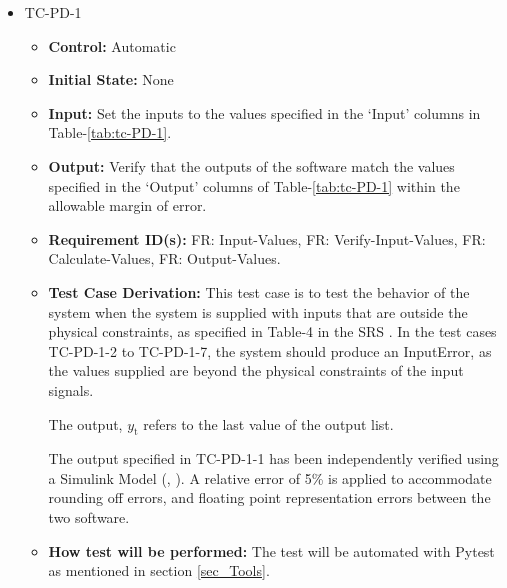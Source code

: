\documentclass[12pt, titlepage]{article}
\begin{document}
\begin{itemize}
\item{TC-PD-1\\}
\begin{itemize}

\item{\textbf{Control:}} Automatic
					
\item{\textbf{Initial State:}} None
					
\item{\textbf{Input:}} Set the inputs to the values specified in the `Input' columns 
in Table-\ref{tab:tc-PD-1}.
					
\item{\textbf{Output:}}  Verify that the outputs of the software match the 
values specified in the `Output' columns of Table-\ref{tab:tc-PD-1} within the
allowable margin of error.


\item{\textbf{Requirement ID(s):}}  FR: Input-Values, FR: Verify-Input-Values, FR: Calculate-Values, FR: Output-Values.

\item{\textbf{Test Case Derivation:}}  This test case is to test the behavior of the system 
when the system is supplied with inputs that are outside the physical constraints, as specified in Table-4
in the SRS \cite {SRS}. In the test cases TC-PD-1-2 to TC-PD-1-7, the system should produce an InputError, as
the values supplied are beyond the physical constraints of the input signals.

The output, ${y_{\text{t}}}$ refers to the last value of the output list.

The output specified in TC-PD-1-1 has been independently verified using a Simulink Model (\cite{Simulink}, 
\cite{PD_Controller}). A relative error of 5\% is applied to accommodate rounding off errors,
and floating point representation errors between the two software.

					
\item{\textbf{How test will be performed:}}  The test will be automated with Pytest as mentioned in 
section \ref{sec_Tools}. 
					
\end{itemize}
\end{itemize}
\end{document}
